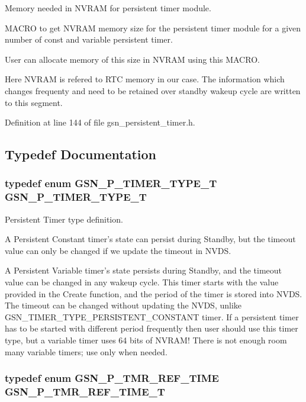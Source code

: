 Memory needed in NVRAM for persistent timer module. 

MACRO to get NVRAM memory size for the persistent timer module for a given number of const and variable persistent timer.

User can allocate memory of this size in NVRAM using this MACRO.

Here NVRAM is refered to RTC memory in our case. The information which changes frequenty and need to be retained over standby wakeup cycle are written to this segment. 

Definition at line 144 of file gsn\_\-persistent\_\-timer.h.



\subsection{Typedef Documentation}
\hypertarget{a00671_gad756dc4e5d1d8eb116b9daf7bddddb69}{
\subsubsection[{GSN\_\-P\_\-TIMER\_\-TYPE\_\-T}]{\setlength{\rightskip}{0pt plus 5cm}typedef enum {\bf GSN\_\-P\_\-TIMER\_\-TYPE\_\-T}  {\bf GSN\_\-P\_\-TIMER\_\-TYPE\_\-T}}}
\label{a00671_gad756dc4e5d1d8eb116b9daf7bddddb69}


Persistent Timer type definition. 

A Persistent Constant timer's state can persist during Standby, but the timeout value can only be changed if we update the timeout in NVDS.

A Persistent Variable timer's state persists during Standby, and the timeout value can be changed in any wakeup cycle. This timer starts with the value provided in the Create function, and the period of the timer is stored into NVDS. The timeout can be changed without updating the NVDS, unlike GSN\_\-TIMER\_\-TYPE\_\-PERSISTENT\_\-CONSTANT timer. If a persistent timer has to be started with different period frequently then user should use this timer type, but a variable timer uses 64 bits of NVRAM! There is not enough room many variable timers; use only when needed. \hypertarget{a00671_ga8d27b193b47e23bf2bd68b439badf3d6}{
\subsubsection[{GSN\_\-P\_\-TMR\_\-REF\_\-TIME\_\-T}]{\setlength{\rightskip}{0pt plus 5cm}typedef enum {\bf GSN\_\-P\_\-TMR\_\-REF\_\-TIME} {\bf GSN\_\-P\_\-TMR\_\-REF\_\-TIME\_\-T}}}
\label{a00671_ga8d27b193b47e23bf2bd68b439badf3d6}


